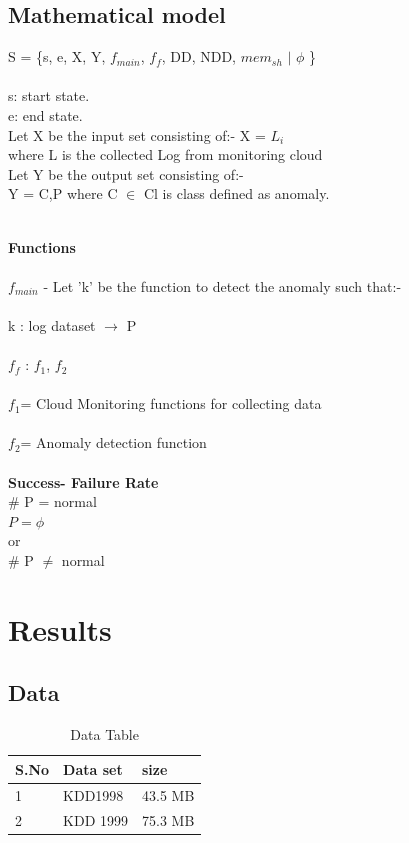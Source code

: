 \documentclass[a4paper, 12pt]{article}
\begin{document}
\subsection{Mathematical model}
\par
S = \{s, e, X, Y, $f_{main}$, $f_f$, DD, NDD, $mem_{sh}$ $\vert$  $\phi$ \}\\\\
 s: start state.\\
 e: end state.\\

Let X be the input set consisting of:-  X = $L_i$\\
where L is the collected Log from monitoring cloud \\
Let Y be the output set consisting of:-\\
Y = {C,P} where C $\in$ Cl is class defined as anomaly. \\\\

\par
\textbf{Functions}\\\\
$f_{main}$ - Let ’k’ be the function to detect the anomaly  such  that:-\\
\\
k : log dataset $\rightarrow$  {P}\\
\\
$f_{f}$ : { $f_{1}$, $f_{2}$ }\\
\\
$f_{1}$= Cloud Monitoring functions for collecting data\\
\\
$f_{2}$= Anomaly detection function\\
\\
\textbf{Success- Failure Rate}\\

$\#$ P = normal\\
$P = {\phi}$ \\or\\ \# P $\neq$ normal

			
		

\newpage
\section{Results}
\subsection{Data}
\begin{table}[h!]
\centering
\caption{Data Table}
\begin{tabular}{|l|l|l|}
\hline
S.No &Data set  &size  \\ \hline
1 &KDD1998  &43.5 MB  \\ \hline
 2& KDD 1999 &75.3 MB  \\ \hline
\end{tabular}
\label{my-label}
\end{table}
\end{document}
